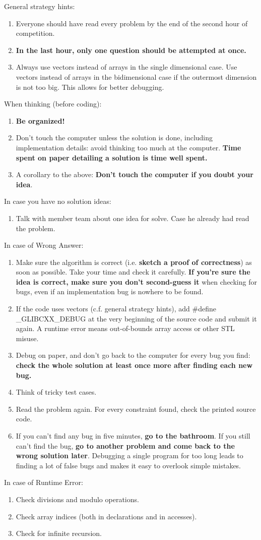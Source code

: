 General strategy hints:
\begin{enumerate}
    \item Everyone should have read every problem by the end of the second hour of competition.
    \item \textbf{In the last hour, only one question should be attempted at once.}
    \item Always use vectors instead of arrays in the single dimensional case. Use vectors instead of arrays in the bidimensional case if the outermost dimension is not too big. This allows for better debugging.
\end{enumerate}

When thinking (before coding):
\begin{enumerate}
    \item \textbf{Be organized!}
    \item Don't touch the computer unless the solution is done, including implementation details: avoid thinking too much at the computer. \textbf{Time spent on paper detailing a solution is time well spent.}
    \item A corollary to the above: \textbf{Don't touch the computer if you doubt your idea}.
\end{enumerate}

In case you have no solution ideas:
\begin{enumerate}
    \item Talk with member team about one idea for solve. Case he already had read the problem.
\end{enumerate}

In case of Wrong Answer:
\begin{enumerate}
    \item Make sure the algorithm is correct (i.e. \textbf{sketch a proof of correctness}) as soon as possible. Take your time and check it carefully. \textbf{If you're sure the idea is correct, make sure you don't second-guess it} when checking for bugs, even if an implementation bug is nowhere to be found.
    \item If the code uses vectors (c.f. general strategy hints), add \#define \_GLIBCXX\_DEBUG at the very beginning of the source code and submit it again. A runtime error means out-of-bounds array access or other STL misuse.
    \item Debug on paper, and don't go back to the computer for every bug you find: \textbf{check the whole solution at least once more after finding each new bug.}
    \item Think of tricky test cases.
    \item Read the problem again. For every constraint found, check the printed source code.
    \item If you can't find any bug in five minutes, \textbf{go to the bathroom}. If you still can't find the bug, \textbf{go to another problem and come back to the wrong solution later}. Debugging a single program for too long leads to finding a lot of false bugs and makes it easy to overlook simple mistakes.
\end{enumerate}

In case of Runtime Error:
\begin{enumerate}
    \item Check divisions and modulo operations.
    \item Check array indices (both in declarations and in accesses).
    \item Check for infinite recursion.
\end{enumerate}
